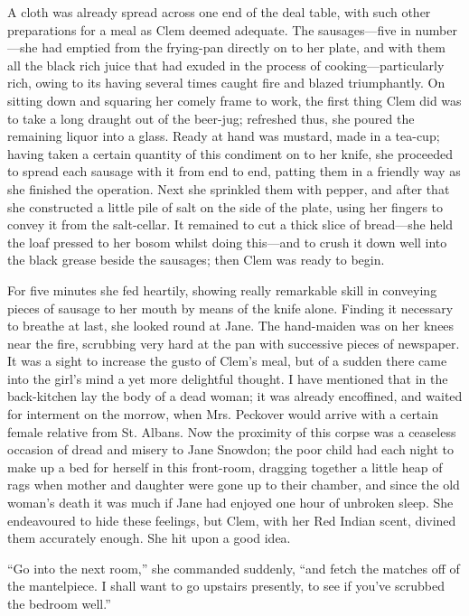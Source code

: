 A cloth was already spread across one end of the deal table, with such
other {\protect\hypertarget{14}{}{}}preparations for a meal as Clem
deemed adequate. The sausages---five in number---she had emptied from
the frying-pan directly on to her plate, and with them all the black
rich juice that had exuded in the process of cooking---particularly
rich, owing to its having several times caught fire and blazed
triumphantly. On sitting down and squaring her comely frame to work, the
first thing Clem did was to take a long draught out of the beer-jug;
refreshed thus, she poured the remaining liquor into a glass. Ready at
hand was mustard, made in a tea-cup; having taken a certain quantity of
this condiment on to her knife, she proceeded to spread each sausage
with it from end to end, patting them in a friendly way as she finished
the operation. Next she sprinkled them with pepper, and after that she
constructed a little pile of salt on the side of the plate, using her
fingers to convey it from the salt-cellar. It remained to cut a thick
slice of bread---she held the loaf pressed to her bosom whilst doing
this---and {\protect\hypertarget{15}{}{}}to crush it down well into the
black grease beside the sausages; then Clem was ready to begin.

For five minutes she fed heartily, showing really remarkable skill in
conveying pieces of sausage to her mouth by means of the knife alone.
Finding it necessary to breathe at last, she looked round at Jane. The
hand-maiden was on her knees near the fire, scrubbing very hard at the
pan with successive pieces of newspaper. It was a sight to increase the
gusto of Clem's meal, but of a sudden there came into the girl's mind a
yet more delightful thought. I have mentioned that in the back-kitchen
lay the body of a dead woman; it was already encoffined, and waited for
interment on the morrow, when Mrs. Peckover would arrive with a certain
female relative from St. Albans. Now the proximity of this corpse was a
ceaseless occasion of dread and misery to Jane Snowdon; the poor child
had each night to make up a bed for herself in this front-room, dragging
together a little heap of rags when {\protect\hypertarget{16}{}{}}mother
and daughter were gone up to their chamber, and since the old woman's
death it was much if Jane had enjoyed one hour of unbroken sleep. She
endeavoured to hide these feelings, but Clem, with her Red Indian scent,
divined them accurately enough. She hit upon a good idea.

``Go into the next room,'' she commanded suddenly, ``and fetch the
matches off of the mantelpiece. I shall want to go upstairs presently,
to see if you've scrubbed the bedroom well.''

